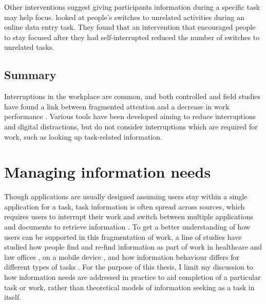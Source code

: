 Other interventions suggest giving participants information during a specific task may help focus. \citet{Gould2016a} looked at people’s switches to unrelated activities during an online data entry task. They found that an intervention that encouraged people to stay focused after they had self-interrupted reduced the number of switches to unrelated tasks. 

\subsection{Summary}
Interruptions in the workplace are common, and both controlled and field studies have found a link between fragmented attention and a decrease in work performance \citep{Bailey2001, Carrier2015}. Various tools have been developed aiming to reduce interruptions and digital distractions, but do not consider interruptions which are required for work, such as looking up task-related information. 

\section{Managing information needs}
Though applications are usually designed assuming users stay within a single application for a task, task information is often spread across sources, which requires users to interrupt their work and switch between multiple applications and documents to retrieve information \citep{Cangiano2009, Czerwinski2004, Mark2005, Sellberg2014}. To get a better understanding of how users can be supported in this fragmentation of work, a line of studies have studied how people find and re-find information as part of work in healthcare \citep{Reddy2002} and law offices \citep{Cangiano2009, Makri2008}, on a mobile device \citep{Sohn2008}, and how information behaviour differs for different types of tasks \citep{Bondarenko2005}. For the purpose of this thesis, I limit my discussion to how information needs are addressed in practice to aid completion of a particular task or work, rather than theoretical models of information seeking as a task in itself.


